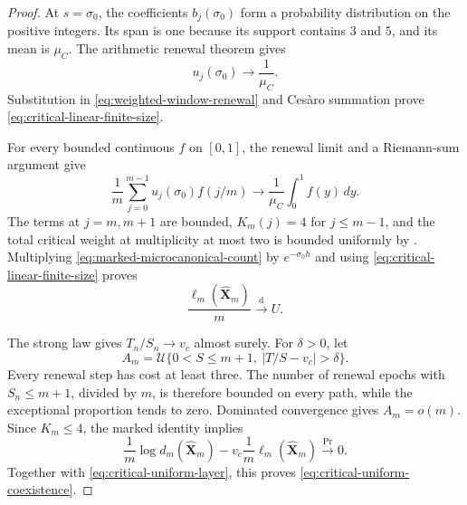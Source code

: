\begin{proof}
At \(s=\sigma_0\), the coefficients \(b_j(\sigma_0)\) form a probability
distribution on the positive integers.  Its span is one because its support
contains \(3\) and \(5\), and its mean is \(\mu_C\).  The arithmetic renewal
theorem gives
\[
 u_j(\sigma_0)\longrightarrow\frac1{\mu_C}.
\]
Substitution in \eqref{eq:weighted-window-renewal} and Ces\`aro summation prove
\eqref{eq:critical-linear-finite-size}.

For every bounded continuous \(f\) on \([0,1]\), the renewal limit and a
Riemann-sum argument give
\[
 \frac1m\sum_{j=0}^{m-1}u_j(\sigma_0)f(j/m)
 \longrightarrow\frac1{\mu_C}\int_0^1f(y)\,dy.
\]
The terms at \(j=m,m+1\) are bounded, \(K_m(j)=4\) for \(j\le m-1\), and
the total critical weight at multiplicity at most two is bounded uniformly
by .  Multiplying
\eqref{eq:marked-microcanonical-count} by \(e^{-\sigma_0h}\) and using
\eqref{eq:critical-linear-finite-size} proves
\begin{equation}
 \frac{\ell_m(\widehat{\mathbf X}_m)}m\xrightarrow{\mathrm d}U.
 \label{eq:critical-uniform-layer}
\end{equation}

The strong law gives \(T_n/S_n\to v_c\) almost surely.  For \(\delta>0\),
let
\[
 A_m=\mathcal U\{0<S\le m+1,\ |T/S-v_c|>\delta\}.
\]
Every renewal step has cost at least three.  The number of renewal epochs
with \(S_n\le m+1\), divided by \(m\), is therefore bounded on every path,
while the exceptional proportion tends to zero.  Dominated convergence
gives \(A_m=o(m)\).  Since \(K_m\le4\), the marked identity implies
\[
 \frac1m\log d_m(\widehat{\mathbf X}_m)
 -v_c\frac1m\ell_m(\widehat{\mathbf X}_m)
 \xrightarrow{\Pr}0.
\]
Together with \eqref{eq:critical-uniform-layer}, this proves
\eqref{eq:critical-uniform-coexistence}.
\end{proof}
\fi
